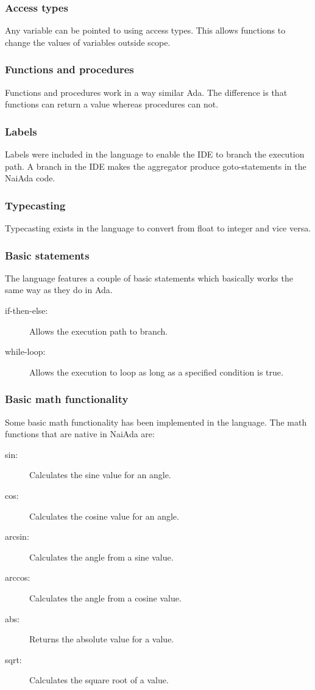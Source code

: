 \subsubsection{Access types}
Any variable can be pointed to using access types. This allows functions to change the values of variables outside scope.

\subsubsection{Functions and procedures}
Functions and procedures work in a way similar Ada. The difference is that functions can return a value whereas procedures can not.

\subsubsection{Labels}
Labels were included in the language to enable the IDE to branch the execution path. A branch in the IDE makes the aggregator produce goto-statements in the NaiAda code.

\subsubsection{Typecasting}
Typecasting exists in the language to convert from float to integer and vice versa.

\subsubsection{Basic statements}
The language features a couple of basic statements which basically works the same way as they do in Ada.
\begin{description}
\item[if-then-else:] Allows the execution path to branch.
\item[while-loop:] Allows the execution to loop as long as a specified condition is true.
\end{description}

\subsubsection{Basic math functionality}
Some basic math functionality has been implemented in the language. The math functions that are native in NaiAda are:
\begin{description}
\item[sin:] Calculates the sine value for an angle.
\item[cos:] Calculates the cosine value for an angle.
\item[arcsin:] Calculates the angle from a sine value.
\item[arccos:] Calculates the angle from a cosine value.
\item[abs:] Returns the absolute value for a value.
\item[sqrt:] Calculates the square root of a value.
\end{description}


